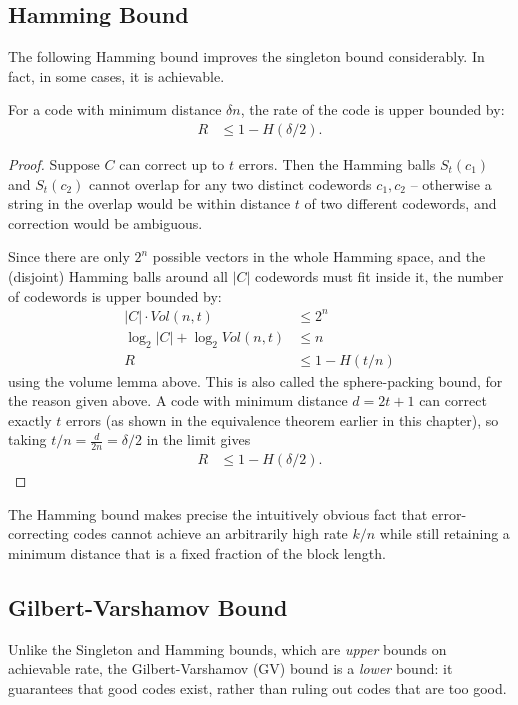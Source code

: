 \subsection{Hamming Bound}
 The following Hamming bound improves the singleton bound considerably. In fact, in some cases, it is achievable.

\begin{theorem}
For a code with minimum distance \(\delta n\), the rate of the code is upper bounded by: 
\begin{align*}
    R &\leq 1 - H(\delta/2). 
\end{align*}
\end{theorem}
\begin{proof}
Suppose \(C\) can correct up to \(t\) errors. Then the Hamming balls \(S_t(c_1)\) and \(S_t(c_2)\) cannot overlap for any two distinct codewords \(c_1, c_2\) -- otherwise a string in the overlap would be within distance \(t\) of two different codewords, and correction would be ambiguous.

Since there are only \(2^n\) possible vectors in the whole Hamming space, and the (disjoint) Hamming balls around all \(|C|\) codewords must fit inside it, the number of codewords is upper bounded by:
\begin{align*}
    |C| \cdot Vol(n, t) &\leq 2^n \\
    \log_2 |C| + \log_2 Vol(n, t) &\leq n \\
    R &\leq 1 - H(t/n) 
\end{align*}
using the volume lemma above. This is also called the sphere-packing bound, for the reason given above. A code with minimum distance \(d=2t+1\) can correct exactly \(t\) errors (as shown in the equivalence theorem earlier in this chapter), so taking \(t/n = \frac{d}{2n} = \delta/2\) in the limit gives
\begin{align*}
    R &\leq 1 - H(\delta/2). 
\end{align*}
\end{proof}

The Hamming bound makes precise the intuitively obvious fact that error-correcting codes cannot achieve an arbitrarily high rate \(k/n\) while still retaining a minimum distance that is a fixed fraction of the block length. 

\subsection{Gilbert-Varshamov Bound}
Unlike the Singleton and Hamming bounds, which are \emph{upper} bounds on achievable rate, the Gilbert-Varshamov (GV) bound is a \emph{lower} bound: it guarantees that good codes exist, rather than ruling out codes that are too good.

